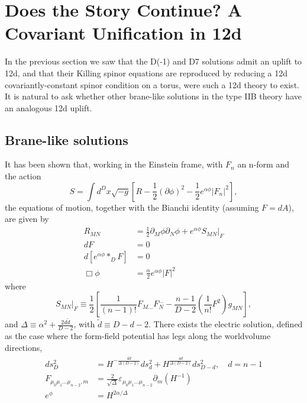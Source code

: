 \section{Does the Story Continue? A Covariant Unification in 12d}
\label{sec:covariant-unification}

In the previous section we saw that the D(-1) and D7 solutions admit an uplift to 12d, and that their Killing spinor equations are reproduced by reducing a 12d covariantly-constant spinor condition on a torus, were such a 12d theory to exist.
It is natural to ask whether other brane-like solutions in the type IIB theory have an analogous 12d uplift.


\subsection{Brane-like solutions}
\label{sec:general brane solns}
It has been shown \cite{Stelle:1998xg} that, working in the Einstein frame, with $F_n$ an n-form and the action
\begin{equation}
S = \int d^Dx\sqrt{-g}\left[
    R - \frac{1}{2}(\partial\phi)^2 - \frac{1}{2}e^{\alpha\phi}|F_n|^2
\right],
\end{equation}
the equations of motion, together with the Bianchi identity (assuming $F = dA$), are given by
\begin{equation}
\begin{aligned}
R_{MN}
&= \frac{1}{2}\partial_M\phi\partial_N\phi + e^{\alpha\phi}S_{MN}\big|_F\\
dF&=0\\
d[e^{\alpha\phi}*_D F] &=0\\
\Box\phi&=\frac{\alpha}{2}e^{\alpha\phi}|F|^2
\end{aligned}
\end{equation}
where
\begin{equation}
S_{MN}\big|_{F}\equiv
\frac{1}{2}\left[
    \frac{1}{(n-1)!}F_{M...}F_N^{...}
    -\frac{n-1}{D-2}\left(\frac{1}{n!}F^2\right)g_{MN}
\right],
\end{equation}
and $\Delta\equiv \alpha^2 +\frac{2 d \tilde{d}}{D-2}$, with $\tilde{d} \equiv D-d-2$.
There exists the electric solution, defined as the case where the form-field potential has legs along the worldvolume directions,
\begin{equation}
\begin{aligned}
ds_D^2
&=H^{-\frac{4\tilde d}{\Delta(D-2)}}ds_{d}^2+
H^{\frac{4d}{\Delta(D-2)}}ds_{D-d}^2,\quad
d = n-1\\
F_{\mu_0\mu_1...\mu_{n-2},m}
&=\frac{2}{\sqrt\Delta}\varepsilon_{\mu_0\mu_1...\mu_{n-2}}\partial_m (H^{-1})\\
e^\phi
&=H^{2\alpha/\Delta}
\end{aligned}
\end{equation}
